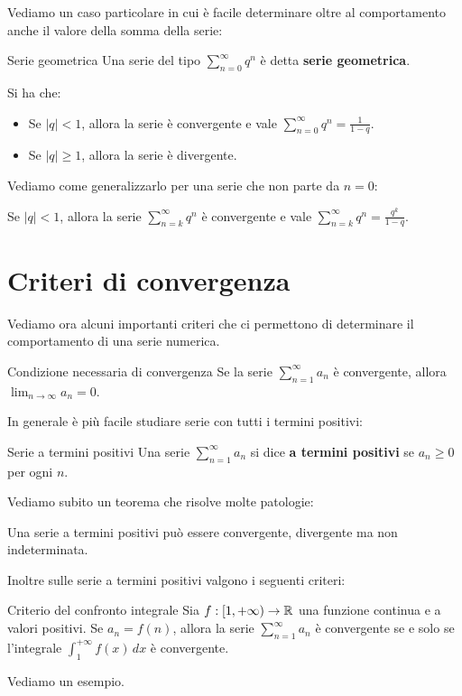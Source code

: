 Vediamo un caso particolare in cui è facile determinare oltre al comportamento anche il valore della somma della serie:
\begin{definizione}{Serie geometrica}
  Una serie del tipo $\sum_{n=0}^{\infty} q^n$ è detta \textbf{serie geometrica}.\\
\end{definizione}
\begin{teorema}{}
  Si ha che:
  \begin{itemize}
    \item Se $|q| < 1$, allora la serie è convergente e vale $\sum_{n=0}^{\infty} q^n = \frac{1}{1-q}$.
    \item Se $|q| \geq 1$, allora la serie è divergente.
  \end{itemize}
\end{teorema}
Vediamo come generalizzarlo per una serie che non parte da $n=0$:
\begin{osservazione}{}
  Se $|q| < 1$, allora la serie $\sum_{n=k}^{\infty} q^n$ è convergente e vale $\sum_{n=k}^{\infty} q^n = \frac{q^k}{1-q}$.
\end{osservazione}

\section{Criteri di convergenza}
Vediamo ora alcuni importanti criteri che ci permettono di determinare il comportamento di una serie numerica.
\begin{teorema}{Condizione necessaria di convergenza}
  Se la serie $\sum_{n=1}^{\infty} a_n$ è convergente, allora $\lim_{n \to \infty} a_n = 0$.
\end{teorema}

In generale è più facile studiare serie con tutti i termini positivi:
\begin{definizione}{Serie a termini positivi}
  Una serie $\sum_{n=1}^{\infty} a_n$ si dice \textbf{a termini positivi} se $a_n \geq 0$ per ogni $n$.
\end{definizione}

Vediamo subito un teorema che risolve molte patologie:
\begin{teorema}{}
  Una serie a termini positivi può essere convergente, divergente ma non indeterminata.\\
\end{teorema}
Inoltre sulle serie a termini positivi valgono i seguenti criteri:
\begin{teorema}{Criterio del confronto integrale}
  Sia $f:[1, +\infty) \to \mathbb{R}$ una funzione continua e a valori positivi. Se $a_n = f(n)$, allora la serie $\sum_{n=1}^{\infty} a_n$ è convergente se e solo se l'integrale $\int_{1}^{+\infty} f(x) \, dx$ è convergente.
\end{teorema}
Vediamo un esempio.\\

